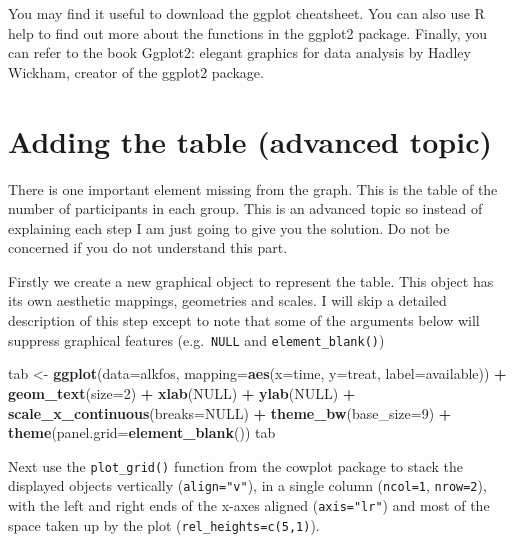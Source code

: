 \documentclass[
]{book}
\newenvironment{Shaded}{\begin{snugshade}}{\end{snugshade}}
\newcommand{\AttributeTok}[1]{\textcolor[rgb]{0.13,0.29,0.53}{#1}}
\newcommand{\ConstantTok}[1]{\textcolor[rgb]{0.56,0.35,0.01}{#1}}
\newcommand{\DecValTok}[1]{\textcolor[rgb]{0.00,0.00,0.81}{#1}}
\newcommand{\FunctionTok}[1]{\textcolor[rgb]{0.13,0.29,0.53}{\textbf{#1}}}
\newcommand{\NormalTok}[1]{#1}
\newcommand{\OtherTok}[1]{\textcolor[rgb]{0.56,0.35,0.01}{#1}}
\newcommand{\SpecialCharTok}[1]{\textcolor[rgb]{0.81,0.36,0.00}{\textbf{#1}}}
\begin{document}
You may find it useful to download the ggplot cheatsheet. You can also use R help to find out more about the functions in the ggplot2 package. Finally, you can refer to the book Ggplot2: elegant graphics for data analysis by Hadley Wickham, creator of the ggplot2 package.

\section{Adding the table (advanced topic)}\label{adding-the-table-advanced-topic}

There is one important element missing from the graph. This is the table of the number of participants in each group. This is an advanced topic so instead of explaining each step I am just going to give you the solution. Do not be concerned if you do not understand this part.

Firstly we create a new graphical object to represent the table. This object has its own aesthetic mappings, geometries and scales. I will skip a detailed description of this step except to note that some of the arguments below will suppress graphical features (e.g.~\texttt{NULL} and \texttt{element\_blank()})

\begin{Shaded}
\begin{Highlighting}[]
\NormalTok{tab }\OtherTok{\textless{}{-}} \FunctionTok{ggplot}\NormalTok{(}\AttributeTok{data=}\NormalTok{alkfos, }
              \AttributeTok{mapping=}\FunctionTok{aes}\NormalTok{(}\AttributeTok{x=}\NormalTok{time, }\AttributeTok{y=}\NormalTok{treat, }\AttributeTok{label=}\NormalTok{available)) }\SpecialCharTok{+}
              \FunctionTok{geom\_text}\NormalTok{(}\AttributeTok{size=}\DecValTok{2}\NormalTok{) }\SpecialCharTok{+} \FunctionTok{xlab}\NormalTok{(}\ConstantTok{NULL}\NormalTok{) }\SpecialCharTok{+} \FunctionTok{ylab}\NormalTok{(}\ConstantTok{NULL}\NormalTok{) }\SpecialCharTok{+}
              \FunctionTok{scale\_x\_continuous}\NormalTok{(}\AttributeTok{breaks=}\ConstantTok{NULL}\NormalTok{) }\SpecialCharTok{+} 
              \FunctionTok{theme\_bw}\NormalTok{(}\AttributeTok{base\_size=}\DecValTok{9}\NormalTok{) }\SpecialCharTok{+}
              \FunctionTok{theme}\NormalTok{(}\AttributeTok{panel.grid=}\FunctionTok{element\_blank}\NormalTok{())}
\NormalTok{tab}
\end{Highlighting}
\end{Shaded}

Next use the \texttt{plot\_grid()} function from the cowplot package to stack the displayed objects vertically (\texttt{align="v"}), in a single column (\texttt{ncol=1}, \texttt{nrow=2}), with the left and right ends of the x-axes aligned (\texttt{axis="lr"}) and most of the space taken up by the plot (\texttt{rel\_heights=c(5,1)}).
\end{document}
